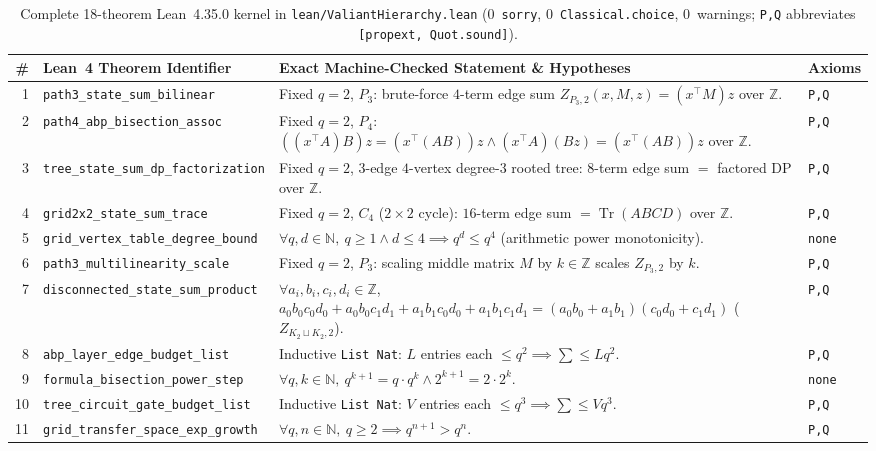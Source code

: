 \documentclass[10pt,twocolumn]{article}
\newcommand{\ZZ}{\mathbb{Z}}
\newcommand{\NN}{\mathbb{N}}
\begin{document}
\begin{table}[t]
\centering
\caption{Complete 18-theorem Lean~4.35.0 kernel in \texttt{lean/ValiantHierarchy.lean} ($0$~\texttt{sorry}, $0$~\texttt{Classical.choice}, $0$~warnings; \texttt{P,Q} abbreviates \texttt{[propext, Quot.sound]}).}
\label{tab:lean}
\scriptsize
\setlength{\tabcolsep}{2.8pt}
\begin{tabular}{@{}r l p{10.6cm} l@{}}
\toprule
\# & Lean~4 Theorem Identifier & Exact Machine-Checked Statement \& Hypotheses & Axioms \\
\midrule
1 & \texttt{path3\_state\_sum\_bilinear} & Fixed $q{=}2$, $P_3$: brute-force $4$-term edge sum $Z_{P_3,2}(x,M,z) = (x^\top M)z$ over $\ZZ$. & \texttt{P,Q} \\
2 & \texttt{path4\_abp\_bisection\_assoc} & Fixed $q{=}2$, $P_4$: $((x^\top A)B)z = (x^\top(AB))z \wedge (x^\top A)(Bz) = (x^\top(AB))z$ over $\ZZ$. & \texttt{P,Q} \\
3 & \texttt{tree\_state\_sum\_dp\_factorization} & Fixed $q{=}2$, $3$-edge $4$-vertex degree-$3$ rooted tree: $8$-term edge sum $=$ factored DP over $\ZZ$. & \texttt{P,Q} \\
4 & \texttt{grid2x2\_state\_sum\_trace} & Fixed $q{=}2$, $C_4$ ($2\times 2$ cycle): $16$-term edge sum $= \operatorname{Tr}(ABCD)$ over $\ZZ$. & \texttt{P,Q} \\
5 & \texttt{grid\_vertex\_table\_degree\_bound} & $\forall q,d\in\NN,\ q\ge 1 \wedge d\le 4 \implies q^d \le q^4$ (arithmetic power monotonicity). & \texttt{none} \\
6 & \texttt{path3\_multilinearity\_scale} & Fixed $q{=}2$, $P_3$: scaling middle matrix $M$ by $k\in\ZZ$ scales $Z_{P_3,2}$ by $k$. & \texttt{P,Q} \\
7 & \texttt{disconnected\_state\_sum\_product} & $\forall a_i,b_i,c_i,d_i\in\ZZ$, $a_0b_0c_0d_0{+}a_0b_0c_1d_1{+}a_1b_1c_0d_0{+}a_1b_1c_1d_1 = (a_0b_0{+}a_1b_1)(c_0d_0{+}c_1d_1)$ ($Z_{K_2\sqcup K_2,2}$). & \texttt{P,Q} \\
8 & \texttt{abp\_layer\_edge\_budget\_list} & Inductive \texttt{List Nat}: $L$ entries each $\le q^2 \implies \sum \le L q^2$. & \texttt{P,Q} \\
9 & \texttt{formula\_bisection\_power\_step} & $\forall q,k\in\NN,\ q^{k+1} = q\cdot q^k \wedge 2^{k+1} = 2\cdot 2^k$. & \texttt{none} \\
10 & \texttt{tree\_circuit\_gate\_budget\_list} & Inductive \texttt{List Nat}: $V$ entries each $\le q^3 \implies \sum \le V q^3$. & \texttt{P,Q} \\
11 & \texttt{grid\_transfer\_space\_exp\_growth} & $\forall q,n\in\NN,\ q\ge 2 \implies q^{n+1} > q^n$. & \texttt{P,Q} \\

\end{tabular}
\end{table}
\end{document}
